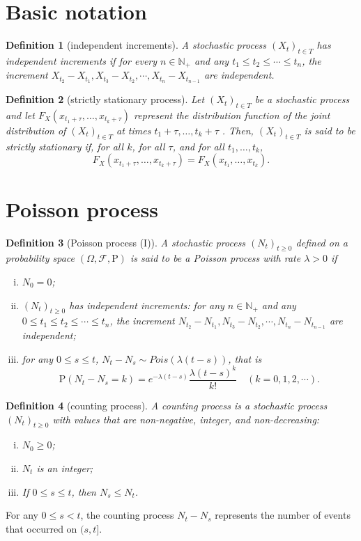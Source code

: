 \documentclass{article}
\newtheorem{definition}{Definition}[section]
\theoremstyle{nonumberplain}
\begin{document}
\section{Basic notation}
\begin{definition}[independent increments]
  A stochastic process $(X_t)_{t\in T}$ has \emph{independent increments} if for every $n\in \mathbb{N}_+$ and any $t_1\le t_2 \le\cdots\le t_n$, the increment $X_{t_2}-X_{t_1},X_{t_3}-X_{t_2},\cdots,X_{t_n}-X_{t_{n-1}}$ are independent.
\end{definition}


\begin{definition}[strictly stationary process]
	Let $(X_t)_{t\in T}$ be a stochastic process and let  $F_{{X}}(x_{{t_{1}+\tau }},\ldots ,x_{{t_{k}+\tau }})$ represent the  distribution function of the joint distribution of $(X_t)_{t\in T}$ at times $t_{1}+\tau ,\ldots ,t_{k}+\tau$ . Then, $(X_t)_{t\in T}$ is said to be strictly stationary if, for all $k$, for all $\tau$, and for all $ t_{1},\ldots ,t_{k}$,
	\[
	F_{{X}}(x_{{t_{1}+\tau }},\ldots ,x_{{t_{k}+\tau }})=F_{{X}}(x_{{t_{1}}},\ldots ,x_{{t_{k}}}).
	\]
\end{definition}






\section{Poisson process}
\begin{definition}[Poisson process (I)]
	A stochastic process $(N_t)_{t\ge0}$ defined on a probability space $(\Omega,\mathcal{F},\mathrm{P})$ is said to be a \emph{Poisson process} with rate $\lambda>0$ if
	\begin{enumerate}[(i)]
		\item $N_0=0$;
		\item $(N_t)_{t\ge0}$ has independent increments: for any $n\in \mathbb{N}_+$ and any $0\le t_1\le t_2 \le\cdots\le t_n$, the increment $N_{t_2}-N_{t_1},N_{t_3}-N_{t_2},\cdots,N_{t_n}-N_{t_{n-1}}$ are independent;
		\item for any $0\le s \le t$, $N_t-N_s\sim Pois(\lambda(t-s))$, that is 
		\[
		\mathrm{P}(N_t-N_s=k)=e^{-\lambda(t-s)}\dfrac{\lambda(t-s)^k}{k!}\quad(k=0,1,2,\cdots).
		\]
	\end{enumerate}	
\end{definition}

\begin{definition}[counting process]
	A \emph{counting process} is a stochastic process $(N_t)_{t\ge 0}$ with values that are non-negative, integer, and non-decreasing:
	\begin{enumerate}[(i)]
		\item $N_0\ge0$;
		\item $N_t$ is an integer;
		\item If $0\le s\le t$, then $N_s \le N_t$.
	\end{enumerate}	
		
\end{definition}
For any $0\le s<t$, the counting process $N_t-N_s$ represents the number of events that occurred on $(s,t]$.  
\end{document}
